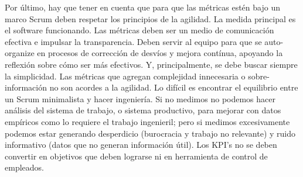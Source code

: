 Por último, hay que tener en cuenta que para que las métricas estén bajo un marco Scrum deben respetar los principios de la agilidad. La medida principal es el software funcionando. Las métricas deben ser un medio de comunicación efectiva e impulsar la transparencia. Deben servir al equipo para que se auto-organize en procesos de corrección de desvíos y mejora contínua, apoyando la reflexión sobre cómo ser más efectivos. Y, principalmente, se debe buscar siempre la simplicidad. Las métricas que agregan complejidad innecesaria o sobre-información no son acordes a la agilidad. Lo difícil es encontrar el equilibrio entre un Scrum minimalista y hacer ingeniería. Si no medimos no podemos hacer análisis del sistema de trabajo, o sistema productivo, para mejorar con datos empíricos como lo requiere el trabajo ingenieril; pero si medimos excesivamente podemos estar generando desperdicio (burocracia y trabajo no relevante) y ruido informativo (datos que no generan información útil). Los KPI's no se deben convertir en objetivos que deben lograrse ni en herramienta de control de empleados.


